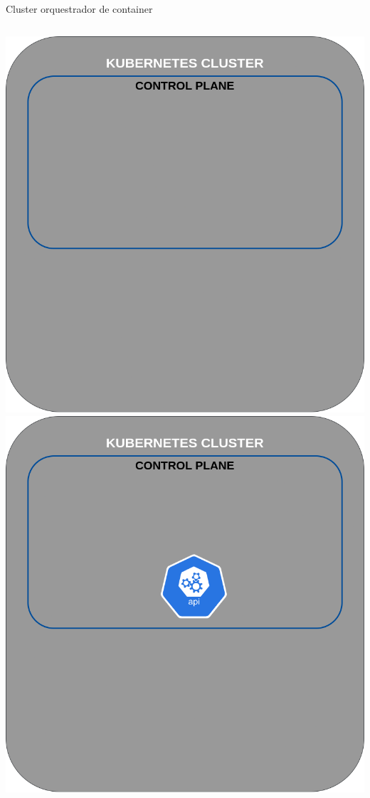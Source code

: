 \documentclass[10pt,brazil]{beamer}
\theoremstyle{definition}
\begin{document}
\begin{frame}{Cluster orquestrador de container}
\begin{columns}
\begin{column}{0.5\textwidth}
\begin{center}
\begin{overprint}
          \includegraphics[width=1\textwidth]{k8s-2.png}
          \includegraphics[width=1\textwidth]{k8s-3.png}

\end{overprint}
\end{center}
\end{column}
\end{columns}
\end{frame}
\end{document}
